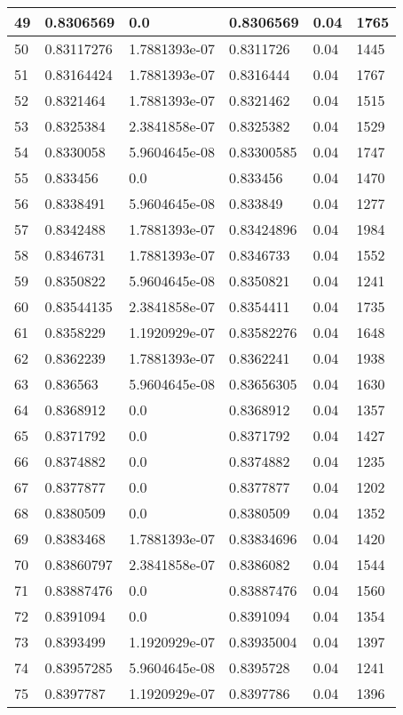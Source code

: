 \begin{longtable}{|l|l|l|l|l|l|}
49 & 0.8306569 & 0.0 & 0.8306569 & 0.04 & 1765 \\ \hline 
50 & 0.83117276 & 1.7881393e-07 & 0.8311726 & 0.04 & 1445 \\ \hline 
51 & 0.83164424 & 1.7881393e-07 & 0.8316444 & 0.04 & 1767 \\ \hline 
52 & 0.8321464 & 1.7881393e-07 & 0.8321462 & 0.04 & 1515 \\ \hline 
53 & 0.8325384 & 2.3841858e-07 & 0.8325382 & 0.04 & 1529 \\ \hline 
54 & 0.8330058 & 5.9604645e-08 & 0.83300585 & 0.04 & 1747 \\ \hline 
55 & 0.833456 & 0.0 & 0.833456 & 0.04 & 1470 \\ \hline 
56 & 0.8338491 & 5.9604645e-08 & 0.833849 & 0.04 & 1277 \\ \hline 
57 & 0.8342488 & 1.7881393e-07 & 0.83424896 & 0.04 & 1984 \\ \hline 
58 & 0.8346731 & 1.7881393e-07 & 0.8346733 & 0.04 & 1552 \\ \hline 
59 & 0.8350822 & 5.9604645e-08 & 0.8350821 & 0.04 & 1241 \\ \hline 
60 & 0.83544135 & 2.3841858e-07 & 0.8354411 & 0.04 & 1735 \\ \hline 
61 & 0.8358229 & 1.1920929e-07 & 0.83582276 & 0.04 & 1648 \\ \hline 
62 & 0.8362239 & 1.7881393e-07 & 0.8362241 & 0.04 & 1938 \\ \hline 
63 & 0.836563 & 5.9604645e-08 & 0.83656305 & 0.04 & 1630 \\ \hline 
64 & 0.8368912 & 0.0 & 0.8368912 & 0.04 & 1357 \\ \hline 
65 & 0.8371792 & 0.0 & 0.8371792 & 0.04 & 1427 \\ \hline 
66 & 0.8374882 & 0.0 & 0.8374882 & 0.04 & 1235 \\ \hline 
67 & 0.8377877 & 0.0 & 0.8377877 & 0.04 & 1202 \\ \hline 
68 & 0.8380509 & 0.0 & 0.8380509 & 0.04 & 1352 \\ \hline 
69 & 0.8383468 & 1.7881393e-07 & 0.83834696 & 0.04 & 1420 \\ \hline 
70 & 0.83860797 & 2.3841858e-07 & 0.8386082 & 0.04 & 1544 \\ \hline 
71 & 0.83887476 & 0.0 & 0.83887476 & 0.04 & 1560 \\ \hline 
72 & 0.8391094 & 0.0 & 0.8391094 & 0.04 & 1354 \\ \hline 
73 & 0.8393499 & 1.1920929e-07 & 0.83935004 & 0.04 & 1397 \\ \hline 
74 & 0.83957285 & 5.9604645e-08 & 0.8395728 & 0.04 & 1241 \\ \hline 
75 & 0.8397787 & 1.1920929e-07 & 0.8397786 & 0.04 & 1396 \\ \hline 
\end{longtable}